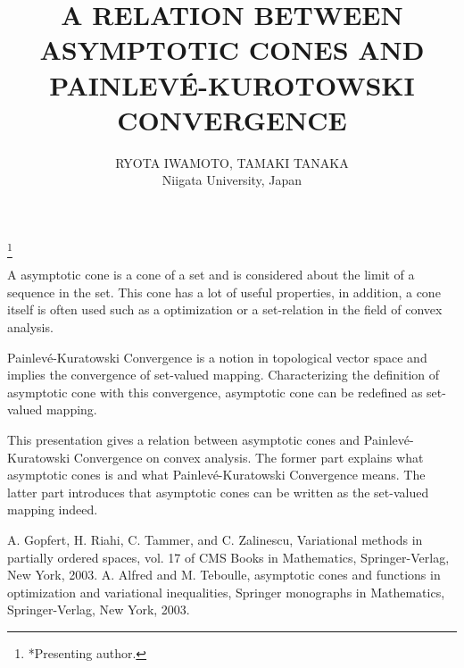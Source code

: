 \documentclass[a4,11pt]{amsart}
\begin{document}
\pagestyle{plain}
%
\title[A RELATION BETWEEN ASYMPTOTIC CONES AND PAINLEV\'E-KUROTOWSKI CONVERGENCE]%
{A RELATION BETWEEN ASYMPTOTIC CONES AND PAINLEV\'E-KUROTOWSKI CONVERGENCE}
\author[RYOTA IWAMOTO, TAMAKI TANAKA]%
{RYOTA IWAMOTO, TAMAKI TANAKA
\\
Niigata University, Japan}
\thanks{*Presenting author.}
\address[R.Iwamoto, T.Tanaka]%
{Niigata University, Niigata 950–2181, Japan.}
%
%
\maketitle
A asymptotic cone is a cone of a set and is considered about the limit of a sequence in the set. This cone has a lot of useful properties, in addition, a cone itself is often used such as a optimization or a set-relation in the field of convex analysis.

Painlev\'e-Kuratowski Convergence is a notion in topological vector space and implies the convergence of set-valued mapping. Characterizing the definition of asymptotic cone with this convergence, asymptotic cone can be redefined as set-valued mapping.

This presentation gives a relation between asymptotic cones and Painlev\'e-Kuratowski Convergence on convex analysis. The former part explains what asymptotic cones is and what Painlev\'e-Kuratowski Convergence means. The latter part introduces that asymptotic cones can be written as the set-valued mapping indeed.
\begin{thebibliography}{9}%
\bibitem{} A. Gopfert, H. Riahi, C. Tammer, and C. Zalinescu, Variational methods in partially ordered spaces, vol. 17 of CMS Books in Mathematics, Springer-Verlag, New York, 2003.
\bibitem{} A. Alfred and M. Teboulle, asymptotic cones and functions in optimization and variational inequalities, Springer monographs in Mathematics, Springer-Verlag, New York, 2003.
\end{thebibliography}
%
\end{document}
